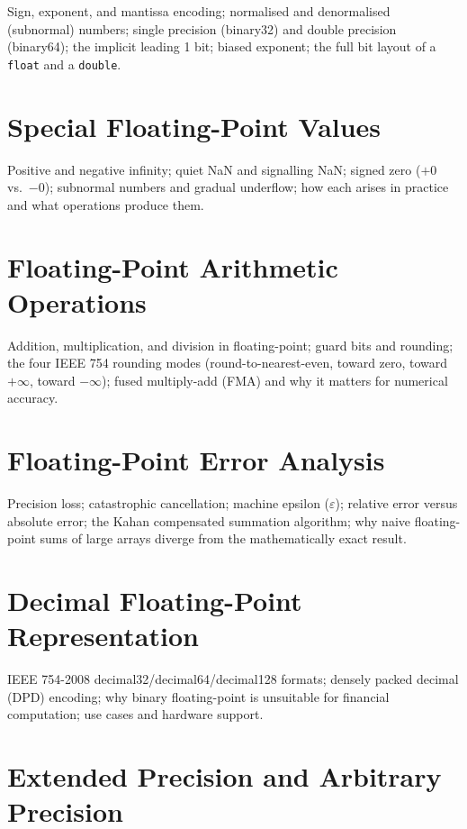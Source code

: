 Sign, exponent, and mantissa encoding; normalised and denormalised
(subnormal) numbers; single precision (binary32) and double precision
(binary64); the implicit leading 1 bit; biased exponent; the full bit
layout of a \texttt{float} and a \texttt{double}.

\chapter{Special Floating-Point Values}
\label{ch:float-specials}

Positive and negative infinity; quiet NaN and signalling NaN; signed zero
($+0$ vs.\ $-0$); subnormal numbers and gradual underflow; how each arises
in practice and what operations produce them.

\chapter{Floating-Point Arithmetic Operations}
\label{ch:float-arithmetic}

Addition, multiplication, and division in floating-point; guard bits and
rounding; the four IEEE 754 rounding modes (round-to-nearest-even, toward
zero, toward $+\infty$, toward $-\infty$); fused multiply-add (FMA) and
why it matters for numerical accuracy.

\chapter{Floating-Point Error Analysis}
\label{ch:float-error}

Precision loss; catastrophic cancellation; machine epsilon ($\varepsilon$);
relative error versus absolute error; the Kahan compensated summation
algorithm; why naive floating-point sums of large arrays diverge from the
mathematically exact result.

\chapter{Decimal Floating-Point Representation}
\label{ch:decimal-float}

IEEE 754-2008 decimal32/decimal64/decimal128 formats; densely packed decimal
(DPD) encoding; why binary floating-point is unsuitable for financial
computation; use cases and hardware support.

\chapter{Extended Precision and Arbitrary Precision}
\label{ch:extended-precision}

